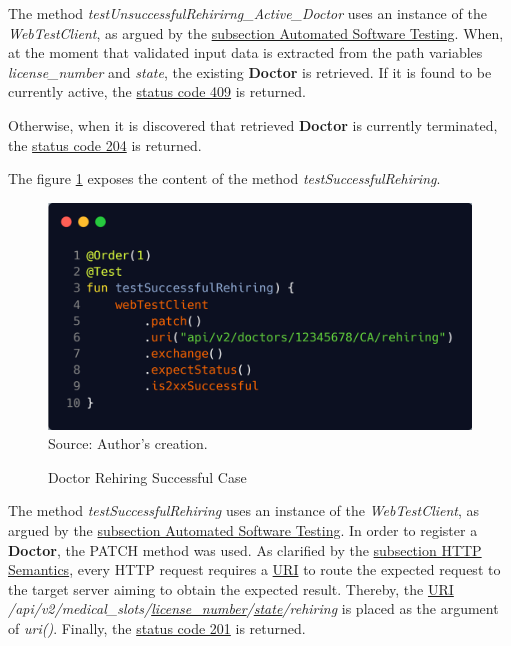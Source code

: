 The method \textit{testUnsuccessfulRehirirng\_Active\_Doctor} uses an instance of the \textit{WebTestClient}, as argued by the \hyperref[subsection:automated_software_testing]{subsection Automated Software Testing}. When, at the moment that validated input data is extracted from the path variables \textit{license\_number} and \textit{state}, the existing \textbf{Doctor} is retrieved. If it is found to be currently active, the \hyperref[tab:summary_http_status_codes]{status code 409} is returned.

Otherwise, when it is discovered that retrieved \textbf{Doctor} is currently terminated, the \hyperref[tab:summary_http_status_codes]{status code 204} is returned.

The figure \ref{fig:doctor_rehiring_successful_integration_test} exposes the content of the method \textit{testSuccessfulRehiring}.

\begin{figure}[H]
	\centering
	\caption{Doctor Rehiring Successful Case}
	\includegraphics[width=1\linewidth]
	{figures/doctor_rehiring_successful_integration_test.png}
	\label{fig:doctor_rehiring_successful_integration_test}
	\footnotesize Source: Author's creation.
\end{figure}

The method \textit{testSuccessfulRehiring} uses an instance of the \textit{WebTestClient}, as argued by the \hyperref[subsection:automated_software_testing]{subsection Automated Software Testing}. In order to register a \textbf{Doctor}, the PATCH method was used. As clarified by the \hyperref[subsection:http_semantics]{subsection HTTP Semantics}, every HTTP request requires a \hyperref[appendix:glossary]{URI} to route the expected request to the target server aiming to obtain the expected result. Thereby, the \hyperref[appendix:glossary]{URI} \textit{/api/v2/medical\_slots/\underline{license\_number}/\underline{state}/rehiring} is placed as the argument of \textit{uri()}. Finally, the \hyperref[tab:summary_http_status_codes]{status code 201} is returned.

